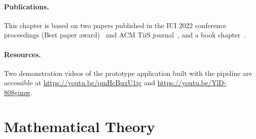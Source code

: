 \paragraph{Publications.} This chapter is based on two papers published in the IUI 2022 conference proceedings (Best paper award)~\cite{Sluyters:2022:IUI} and ACM TiiS journal~\cite{Sluyters:2023}, and a book chapter~\cite{Lambot:2024}.

\paragraph{Resources.} Two demonstration videos of the prototype application built with the pipeline are accessible at \url{https://youtu.be/qmHcBuxU1ig} and \url{https://youtu.be/YlD-808gimw}.


\section{Mathematical Theory} \label{sec:radar-challenges:mathematical-theory}

